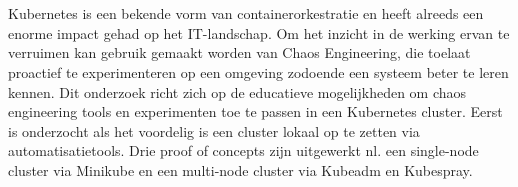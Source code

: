 
%
%

%



\chapter*{}

Kubernetes is een bekende vorm van containerorkestratie en heeft alreeds een enorme impact gehad op het IT-landschap. Om het inzicht in de werking ervan te verruimen kan gebruik gemaakt worden van Chaos Engineering, die toelaat proactief te experimenteren op een omgeving zodoende een systeem beter te leren kennen. Dit onderzoek richt zich op de educatieve mogelijkheden om chaos engineering tools en experimenten toe te passen in een Kubernetes cluster. Eerst is onderzocht als het voordelig is een cluster lokaal op te zetten via automatisatietools. Drie proof of concepts zijn uitgewerkt nl. een single-node cluster via Minikube en een multi-node cluster via Kubeadm en Kubespray.    
 
